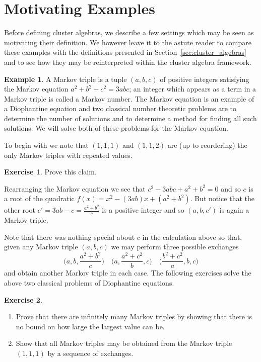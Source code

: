\documentclass{amsart}
\theoremstyle{definition}
\newtheorem{example}[theorem]{Example}
\newtheorem{subexercise}{Exercise}[theorem]
\theoremstyle{remark}
\numberwithin{equation}{section}
\begin{document}
\section{Motivating Examples}\label{sec:motivation}
  Before defining cluster algebras, we describe a few settings which may be seen as motivating their definition.  We however leave it to the astute reader to compare these examples with the definitions presented in Section~\ref{sec:cluster_algebras} and to see how they may be reinterpreted within the cluster algebra framework.

  \begin{example}\label{example:Markov triples}
    A Markov triple is a tuple $(a,b,c)$ of positive integers satisfying the Markov equation $a^2+b^2+c^2=3abc$; an integer which appears as a term in a Markov triple is called a Markov number.  The Markov equation is an example of a Diophantine equation and two classical number theoretic problems are to determine the number of solutions and to determine a method for finding all such solutions.  We will solve both of these problems for the Markov equation.

    To begin with we note that $(1,1,1)$ and $(1,1,2)$ are (up to reordering) the only Markov triples with repeated values.
    \begin{subexercise}
      Prove this claim.
    \end{subexercise}
    Rearranging the Markov equation we see that $c^2-3abc+a^2+b^2=0$ and so $c$ is a root of the quadratic $f(x)=x^2-(3ab)x+(a^2+b^2)$.  But notice that the other root $c'=3ab-c=\frac{a^2+b^2}{c}$ is a positive integer and so $(a,b,c')$ is again a Markov triple.  

    Note that there was nothing special about $c$ in the calculation above so that, given any Markov triple $(a,b,c)$ we may perform three possible exchanges 
    \[\Big(a,b,\frac{a^2+b^2}{c}\Big)\quad\Big(a,\frac{a^2+c^2}{b},c\Big)\quad\Big(\frac{b^2+c^2}{a},b,c\Big)\]
    and obtain another Markov triple in each case.  The following exercises solve the above two classical problems of Diophantine equations.
    \begin{subexercise}\mbox{}
      \begin{enumerate}
        \item Prove that there are infinitely many Markov triples by showing that there is no bound on how large the largest value can be.
        \item Show that all Markov triples may be obtained from the Markov triple $(1,1,1)$ by a sequence of exchanges.
      \end{enumerate}
    \end{subexercise}
  \end{example}
\end{document}
